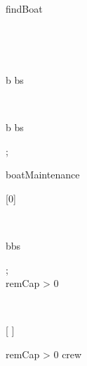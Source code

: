 \begin{vdm}
\begin{op}[e]{findBoat}
\begin{blockstmt}
\begin{letstmt}
\end{letstmt} \\
\begin{blockstmt}
\If {}
\Then \\
\begin{blockstmt}
\Letbe\hspace{0.5em}b \In bs \Best\hspace{0.5em} \Lin \\
\end{blockstmt}
\Else \\
\begin{blockstmt}
\Letbe* b \In bs \Lin \\
\end{blockstmt}
\Fi
\end{blockstmt}
\end{blockstmt};
\end{op}
\begin{op}[e]{boatMaintenance}%
\signature{() \Oto ()}
\parms{}
\begin{blockstmt}
\begin{dclstmt}
[{0}]
\end{dclstmt}
\begin{letstmt}
\end{letstmt} \\
\begin{blockstmt}
\begin{setfor}{b}{bs}
\end{setfor} ; \\
\If remCap > 0
\Then \\
\begin{blockstmt}
\begin{letstmt}
\end{letstmt} \\
\begin{blockstmt}
\begin{dclstmt}
[{ \Dunion {}}]
\end{dclstmt}
\begin{while}{remCap > 0 \And crew \Neq \set{}}

\end{while}
\end{blockstmt}
\end{blockstmt}
\end{blockstmt}
\end{blockstmt}
\end{op}
\end{vdm}
